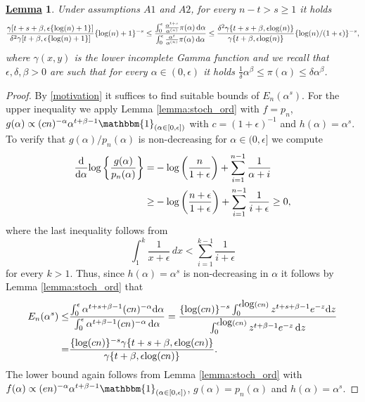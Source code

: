 \documentclass[12pt]{article}
\newtheorem{Lem}{\underline{\bf Lemma}}
\def\log{\hbox{log}}
\begin{document}
\begin{Lem}\label{main}
Under assumptions $A1$ and $A2$, for every $n-t > s \geq 1$ it holds
\[
\frac{\gamma[t+s+\beta,\epsilon\{\log(n)+1\}]}{\delta^2\gamma[t+\beta,\epsilon\{\log(n)+1\}]}\{\log(n)+1\}^{-s}
\leq
\frac{\int_0^\epsilon \frac{\alpha^{t+s}}{\alpha^{(n)}}\pi(\alpha)\, \mathrm{d}\alpha}{\int_0^\epsilon \frac{\alpha^t}{\alpha^{(n)}}\pi(\alpha) \, \mathrm{d}\alpha} 
\leq
\frac{\delta^2 \gamma\{t+s+\beta,\epsilon\log(n)\}}{\gamma\{t+\beta,\epsilon\log(n)\}}\{\log(n)/(1+\epsilon)\}^{-s},
\]
where $\gamma(x,y)$ is the lower incomplete Gamma function and we recall that $\epsilon, \delta, \beta >0$ are such that for every $ \alpha \in (0, \epsilon)$ it holds $\frac{1}{\delta}\alpha^\beta \leq \pi(\alpha) \leq \delta \alpha^\beta$.
\end{Lem}
\begin{proof}
By \eqref{motivation} it suffices to find suitable bounds of $E_n(\alpha^{s})$.
For the upper inequality we apply Lemma \ref{lemma:stoch_ord} with $f=p_n$, $g(\alpha)\propto (cn)^{-\alpha}\alpha^{t+\beta-1}\mathbbm{1}_{\left(\alpha\in[0,\epsilon]\right)}$ with $c=(1+\epsilon)^{-1}$ and $h(\alpha)=\alpha^s$.
To verify that $g(\alpha)/p_n(\alpha)$ is non-decreasing for $\alpha\in(0,\epsilon]$ we compute 
\begin{align*}
\frac{\mathrm{d}}{\mathrm{d}\alpha}\log\left\{\frac{g(\alpha)}{p_n(\alpha)}\right\}=&
-\log \left(\frac{n}{1+\epsilon}\right)+\sum_{i=1}^{n-1}\frac{1}{\alpha+i}\\
\geq&
-\log \left(\frac{n+\epsilon}{1+\epsilon}\right)+\sum_{i=1}^{n-1}\frac{1}{i+\epsilon}
\geq 0,
\end{align*}
where the last inequality follows from 
\[
\int_1^{k}\frac{1}{x+\epsilon} \, dx < \sum_{i = 1}^{k-1}\frac{1}{i+\epsilon}
\]
for every $k > 1$. Thus, since $h(\alpha)=\alpha^s$ is non-decreasing in $\alpha$ it follows by Lemma \ref{lemma:stoch_ord} that
$$
\begin{aligned}
E_n(\alpha^{s})
\leq&
\frac{\int_0^\epsilon \alpha^{t+s+\beta-1}(cn)^{-\alpha} \mathrm{d}\alpha}{\int_0^\epsilon \alpha^{t+\beta-1}(cn)^{-\alpha}\, \mathrm{d}\alpha} 
=
\frac{\{\log(cn)\}^{-s}\int_0^{\epsilon\log(cn)} z^{t+s+\beta-1}e^{-z} \mathrm{d}z}{\int_0^{\epsilon\log(cn)} z^{t+\beta-1}e^{-z}\, \mathrm{d}z} 
\\
=&
\frac{\{\log(cn)\}^{-s}\gamma\{t+s+\beta,\epsilon\log(cn)\}}{\gamma\{t+\beta,\epsilon\log(cn)\}}.
\end{aligned}
$$
The lower bound again follows from Lemma \ref{lemma:stoch_ord} with $f(\alpha) \propto (e n)^{-\alpha}\alpha^{t+\beta-1}\mathbbm{1}_{\left(\alpha\in[0,\epsilon]\right)}$, $g(\alpha)=p_n(\alpha)$ and $h(\alpha)=\alpha^s$.

\end{proof}
\end{document}
